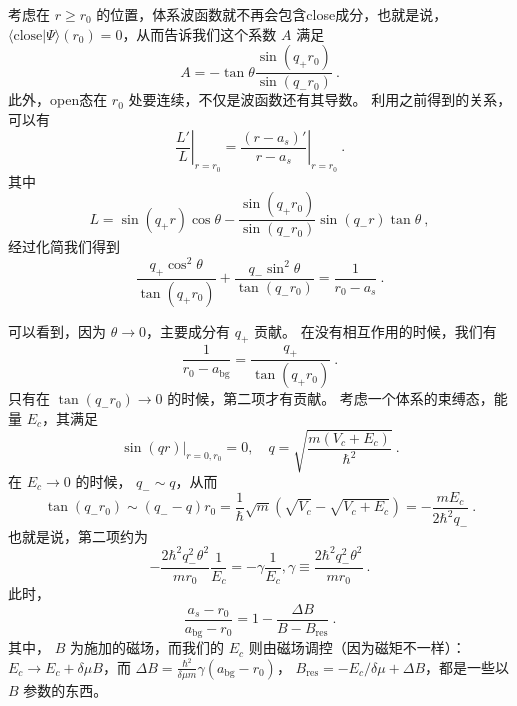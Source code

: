 考虑在 $r\geqslant r_0$ 的位置，体系波函数就不再会包含close成分，也就是说， $\langle\text{close}|\Psi\rangle(r_0) = 0$，从而告诉我们这个系数 $A$ 满足
\begin{equation}
A=-\tan\theta\frac{\sin(q_+r_0)}{\sin(q_-r_0)}~.
\end{equation}
此外，open态在 $r_0$ 处要连续，不仅是波函数还有其导数。 利用之前得到的关系，可以有
\begin{equation}
\left.\frac{L'}{L}\right|_{r=r_0} = \left.\frac{(r-a_s)'}{r-a_s}\right|_{r=r_0}~.
\end{equation}
其中
\begin{equation}
L = \sin(q_+r)\cos\theta - \frac{\sin(q_+r_0)}{\sin(q_-r_0)} \sin(q_-r)\tan\theta~,
\end{equation}
经过化简我们得到
\begin{equation}
\frac{q_+\cos^2\theta}{\tan(q_+r_0)}+\frac{q_-\sin^2\theta}{\tan(q_-r_0)} = \frac{1}{r_0-a_s}~.
\end{equation}

可以看到，因为 $\theta\to0$，主要成分有 $q_+$ 贡献。 在没有相互作用的时候，我们有
\begin{equation}
\frac{1}{r_0-a_{\text{bg}}} = \frac{q_+}{\tan(q_+r_0)}~.
\end{equation}
只有在 $\tan(q_-r_0)\to0$ 的时候，第二项才有贡献。
考虑一个体系的束缚态，能量 $E_c$，其满足
\begin{equation}
\left.\sin(qr)\right|_{r=0,r_0} = 0,\quad q = \sqrt{\frac{m(V_c+E_c)}{\hbar^2}}~.
\end{equation}
在 $E_c\to0$ 的时候， $q_-\sim q$，从而
\begin{equation}
\tan(q_-r_0)\sim (q_- -q) r_0 = \frac{1}{\hbar}\sqrt{m}(\sqrt{V_c}-\sqrt{V_c+E_c}) =-\frac{mE_c}{2\hbar^2 q_-}~.
\end{equation}
也就是说，第二项约为
\begin{equation}
-\frac{2\hbar^2q_-^2\theta^2}{mr_0}\frac{1}{E_c} = -\gamma\frac{1}{E_c}, \gamma\equiv\frac{2\hbar^2q_-^2\theta^2}{mr_0} ~.
\end{equation}
此时，
\begin{equation}
\frac{a_s-r_0}{a_{\text{bg}}-r_0} = 1-\frac{\Delta B}{B-B_{\text{res}}}~.
\end{equation}
其中， $B$ 为施加的磁场，而我们的 $E_c$ 则由磁场调控（因为磁矩不一样）： $E_c\to E_c+\delta\mu B$，而 $\Delta B = \frac{\hbar^2}{\delta\mu m}\gamma(a_{\text{bg}}-r_0)$， $B_{\text{res}} = -{E_c}/{\delta\mu}+\Delta B$，都是一些以 $B$ 参数的东西。